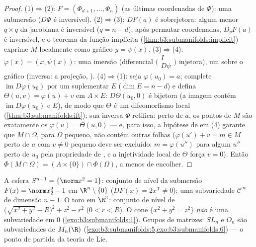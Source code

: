 \begin{proof}
(1)$\Rightarrow$(2): $F = (\Phi_{d+1}, \dots, \Phi_n)$ (as últimas coordenadas de $\Phi$): uma submersão
($D\Phi$ é inversível).
(2)$\Rightarrow$(3): $DF(a)$ é sobrejetora: algum menor $q \times q$ da jacobiana é
inversível ($q = n - d$); após permutar coordenadas, $D_yF(a)$ é inversível, e o
teorema da função implícita (\cref{thm:b3:submanifolds:implicit}) exprime $M$ localmente
como gráfico $y = \psi(x)$.
(3)$\Rightarrow$(4): $\varphi(x) = (x, \psi(x))$: uma imersão (diferencial $\bigl(\begin{smallmatrix}I\\
D\psi\end{smallmatrix}\bigr)$ injetora), um
 sobre o gráfico (inversa: a projeção, ).
(4)$\Rightarrow$(1): seja $\varphi(u_0) = a$; complete $\operatorname{im}D\varphi(u_0)$ por um suplementar $E$ ($\dim E = n - d$)
e defina $\Theta(u, v) = \varphi(u) + v$ em $A\times E$: $D\Theta(u_0, 0)$ é bijetora (a imagem contém $\operatorname{im}D\varphi(u_0)$ e
$E$), de modo que $\Theta$ é um difeomorfismo local
(\cref{thm:b3:submanifolds:ift}); sua inversa $\Phi$ retifica: perto de $a$, os
pontos de $M$ são exatamente os $\varphi(u) = \Theta(u, 0)$ --- e, para isso, a hipótese
de  em (4) garante que $M\cap\Omega$, para $\Omega$ pequeno,
não contém outras folhas ($\varphi(u') + v = m \in
M$ perto de $a$ com $v \neq 0$ pequeno deve
ser excluído: $m = \varphi(u'')$ para algum $u''$ perto de $u_0$ pela
propriedade de , e a injetividade local de $\Theta$
força $v = 0$). Então $\Phi(M\cap\Omega) = (A\times\{0\})
\cap\Phi(\Omega)$, a menos de encolher.
\end{proof}

\begin{example}\label{ex:b3:submanifolds:examples}
A esfera $S^{n-1} = \{\norm x^2 = 1\}$: conjunto de nível da submersão $F(x) = \norm x_2^2 - 1$ em $\R^n\setminus\{0\}$ ($DF(x) = 2x^{\mathsf T} \ne 0$): uma
subvariedade $\mathcal C^\infty$ de dimensão $n - 1$. O toro em $\R^3$:
conjunto de nível de $\bigl(\sqrt{x^2 + y^2} -
R\bigr)^2 + z^2 - r^2$ ($0 < r < R$). O cone $\{x^2 + y^2 =
z^2\}$ \emph{não} é uma
subvariedade em $0$ (\cref{exo:b3:submanifolds:1}). Grupos de matrizes: $SL_n$
e $O_n$ são subvariedades de $M_n(\R)$ (\cref{exo:b3:submanifolds:5,exo:b3:submanifolds:6}) --- o ponto de
partida da teoria de Lie.
\end{example}

